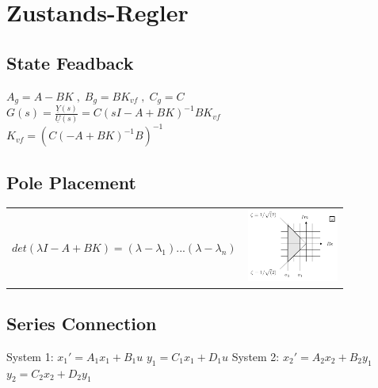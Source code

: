 \section{Zustands-Regler}
\subsection{State Feadback}

$A_g = A-BK \; , \; B_g = BK_{vf} \; , \; C_g = C $\\
$G(s) = \frac{\underline{Y}(s)}{\underline{U}(s)} = C(sI-A+BK)^{-1}BK_{vf}$\\
$K_{vf} = (C(-A+BK)^{-1}B)^{-1}$

\subsection{Pole Placement}

\begin{tabular}{ll}
	\parbox{8cm}{$det(\lambda I-A+BK) = (\lambda - \lambda_1)...(\lambda - \lambda_n)$} &
	\parbox{3cm}{\includegraphics[width=3cm]{./bilder/pole_locations.png}}
\end{tabular}

\subsection{Series Connection}
System 1:
$x_1' = A_1x_1 + B_1u$ \quad
$y_1 = C_1x_1 + D_1u$ \qquad
System 2: 
$x_2' = A_2x_2 + B_2y_1$ \quad
$y_2 = C_2x_2 + D_2y_1$

